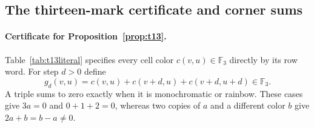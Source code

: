 \documentclass[11pt,a4paper]{article}
\newif\ifshowrevisions
\newcommand{\rev}[1]{{\ifshowrevisions\color{red}\fi #1}}
\theoremstyle{definition}
\numberwithin{equation}{section}
\begin{document}
\FloatBarrier

\subsection{\rev{The thirteen-mark certificate and corner sums}}\label{app:t13certificate}
\paragraph{Certificate for Proposition~\ref{prop:t13}.}
	Table~\ref{tab:t13literal} specifies every cell color $c(v,u)\in\mathbb F_3$ directly by its row word. For step $d>0$ define
	\[
	g_d(v,u)=c(v,u)+c(v+d,u)+c(v+d,u+d)\in\mathbb F_3.
	\]
	A triple sums to zero exactly when it is monochromatic or rainbow. These cases give $3a=0$ and $0+1+2=0$, whereas two copies of $a$ and a different color $b$ give $2a+b=b-a\ne0$.
	
\end{document}
